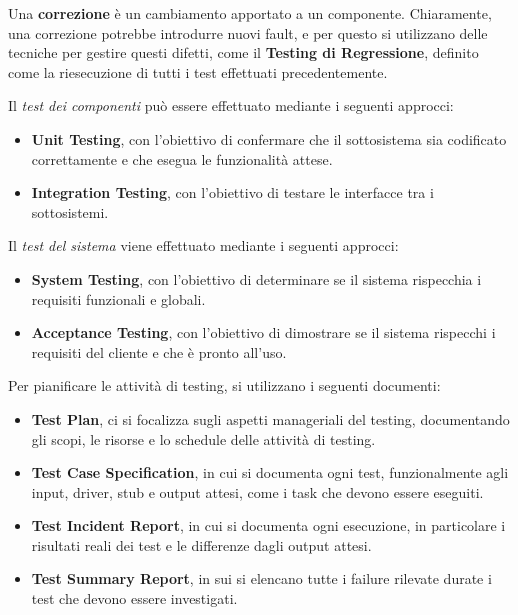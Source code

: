 \documentclass{article}
\begin{document}
    Una \textbf{correzione} è un cambiamento apportato a un componente.  Chiaramente, una correzione potrebbe introdurre nuovi fault, e per questo si utilizzano delle tecniche per gestire questi difetti, come il \textbf{Testing di Regressione}, definito come la riesecuzione di tutti i test effettuati precedentemente.
    
    \vspace{3mm}
    
    Il \textit{test dei componenti} può essere effettuato mediante i seguenti approcci:
    
    \begin{itemize}
        \item \textbf{Unit Testing}, con l'obiettivo di confermare che il sottosistema sia codificato correttamente e che esegua le funzionalità attese.
        
        \item \textbf{Integration Testing}, con l'obiettivo di testare le interfacce tra i sottosistemi.
    \end{itemize}
    
    Il \textit{test del sistema} viene effettuato mediante i seguenti approcci:
    
    \begin{itemize}
        \item \textbf{System Testing}, con l'obiettivo di determinare se il sistema rispecchia i requisiti funzionali e globali.
        
        \item \textbf{Acceptance Testing}, con l'obiettivo di dimostrare se il sistema rispecchi i requisiti del cliente e che è pronto all'uso.
    \end{itemize}
    
    Per pianificare le attività di testing, si utilizzano i seguenti documenti:
    
    \begin{itemize}
        \item \textbf{Test Plan}, ci si focalizza sugli aspetti manageriali del testing, documentando gli scopi, le risorse e lo schedule delle attività di testing.
        
        \item \textbf{Test Case Specification}, in cui si documenta ogni test, funzionalmente agli input, driver, stub e output attesi, come i task che devono essere eseguiti.
        
        \item \textbf{Test Incident Report}, in cui si documenta ogni esecuzione, in particolare i risultati reali dei test e le differenze dagli output attesi.
        
        \item \textbf{Test Summary Report}, in sui si elencano tutte i failure rilevate durate i test che devono essere investigati.
    \end{itemize}        
    
\end{document}
